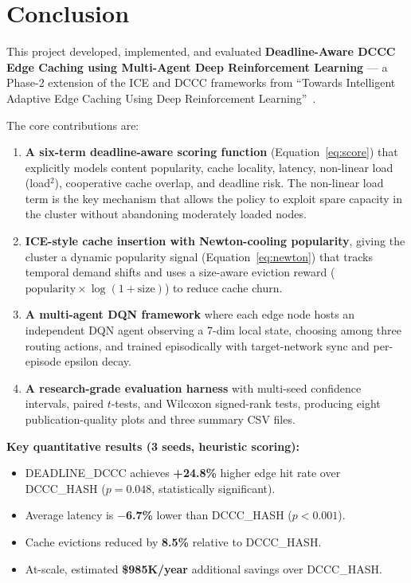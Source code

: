 \documentclass[12pt,a4paper]{report}
\begin{document}
\chapter{Conclusion}
\label{ch:conc}

This project developed, implemented, and evaluated \textbf{Deadline-Aware DCCC Edge
Caching using Multi-Agent Deep Reinforcement Learning} --- a Phase-2 extension of the
ICE and DCCC frameworks from ``Towards Intelligent Adaptive Edge Caching Using Deep
Reinforcement Learning''~\cite{ref1}.

The core contributions are:

\begin{enumerate}
  \item \textbf{A six-term deadline-aware scoring function} (Equation~\ref{eq:score}) that
        explicitly models content popularity, cache locality, latency, non-linear load (load$^2$),
        cooperative cache overlap, and deadline risk. The non-linear load term is the key
        mechanism that allows the policy to exploit spare capacity in the cluster without
        abandoning moderately loaded nodes.

  \item \textbf{ICE-style cache insertion with Newton-cooling popularity}, giving the cluster
        a dynamic popularity signal (Equation~\ref{eq:newton}) that tracks temporal demand
        shifts and uses a size-aware eviction reward ($\text{popularity} \times \log(1+\text{size})$)
        to reduce cache churn.

  \item \textbf{A multi-agent DQN framework} where each edge node hosts an independent
        DQN agent observing a 7-dim local state, choosing among three routing actions, and
        trained episodically with target-network sync and per-episode epsilon decay.

  \item \textbf{A research-grade evaluation harness} with multi-seed confidence intervals,
        paired $t$-tests, and Wilcoxon signed-rank tests, producing eight publication-quality
        plots and three summary CSV files.
\end{enumerate}

\textbf{Key quantitative results (3 seeds, heuristic scoring):}
\begin{itemize}
  \item DEADLINE\_DCCC achieves \textbf{+24.8\%} higher edge hit rate over DCCC\_HASH
        ($p = 0.048$, statistically significant).
  \item Average latency is \textbf{$-$6.7\%} lower than DCCC\_HASH ($p < 0.001$).
  \item Cache evictions reduced by \textbf{8.5\%} relative to DCCC\_HASH.
  \item At-scale, estimated \textbf{\$985K/year} additional savings over DCCC\_HASH.
\end{itemize}
\end{document}
